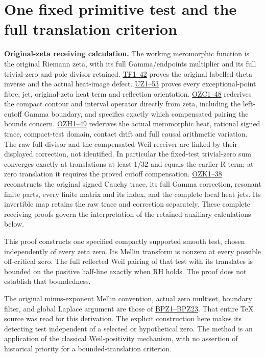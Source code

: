 \documentclass[
  10pt,
  a4paper,
]{article}
\author{}
\date{}
\begin{document}
{
\setcounter{tocdepth}{3}
\tableofcontents
}
\section{One fixed primitive test and the full translation
criterion}\label{one-fixed-primitive-test-and-the-full-translation-criterion}

\textbf{Original-zeta receiving calculation.} The working meromorphic
function is the original Riemann zeta, with its full Gamma/endpoints
multiplier and its full trivial-zero and pole divisor retained.
\href{FAITHFUL_THETA_COMPLETION_RETURN.md}{TF1--42} proves the original
labelled theta inverse and the actual heat-image defect.
\href{FAITHFUL_UNCOMPLETED_ZETA_HEAT.md}{UZ1--53} proves every
exceptional-point fibre, jet, original-zeta heat term and reflection
orientation.
\href{ORIGINAL_ZETA_COMPACT_WEIL_RECONSTRUCTION.md}{OZC1--48} rederives
the compact contour and interval operator directly from zeta, including
the left-cutoff Gamma boundary, and specifies exactly which compensated
pairing the bounds concern.
\href{ORIGINAL_ZETA_HEAT_CONTACT_RECONSTRUCTION.md}{OZH1--49} rederives
the actual meromorphic heat, rational signed trace, compact-test domain,
contact drift and full causal arithmetic variation. The raw full divisor
and the compensated Weil receiver are linked by their displayed
correction, not identified. In particular the fixed-test trivial-zero
sum converges exactly at translations at least 1/32 and equals the
earlier R term; at zero translation it requires the proved cutoff
compensation. \href{ORIGINAL_ZETA_CAUCHY_RECONSTRUCTION.md}{OZK1--38}
reconstructs the original signed Cauchy trace, its full Gamma
correction, resonant finite parts, every finite matrix and its index,
and the complete local heat jets. Its invertible map retains the raw
trace and correction separately. These complete receiving proofs govern
the interpretation of the retained auxiliary calculations below.

This proof constructs one specified compactly supported smooth test,
chosen independently of every zeta zero. Its Mellin transform is nonzero
at every possible off-critical zero. The full reflected Weil pairing of
that test with its translates is bounded on the positive half-line
exactly when RH holds. The proof does not establish that boundedness.

The original minus-exponent Mellin convention, actual zero multiset,
boundary filter, and global Laplace argument are those of
\href{BOUNDARY_PRIMITIVE_ALL_ZERO_RECEIVER.tex}{BPZ1--BPZ23}. That
entire TeX source was read for this derivation. The explicit
construction here makes its detecting test independent of a selected or
hypothetical zero. The method is an application of the classical
Weil-positivity mechanism, with no assertion of historical priority for
a bounded-translation criterion.
\end{document}
